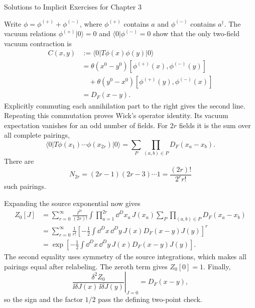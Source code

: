 \begin{bankssolutions}{Solutions to Implicit Exercises for Chapter 3}

Write $\phi=\phi^{(+)}+\phi^{(-)}$, where $\phi^{(+)}$ contains $a$ and
$\phi^{(-)}$ contains $a^\dagger$.  The vacuum relations
\(\phi^{(+)}|0\rangle=0\) and
\(\langle0|\phi^{(-)}=0\) show that the only two-field vacuum contraction is
\begin{align*}
 C(x,y)&:=\langle0|T\phi(x)\phi(y)|0\rangle\\
 &=\theta(x^0-y^0)
   [\phi^{(+)}(x),\phi^{(-)}(y)]\\
 &\quad+\theta(y^0-x^0)
   [\phi^{(+)}(y),\phi^{(-)}(x)]\\
 &=D_F(x-y).
\end{align*}
Explicitly commuting each annihilation part to the right gives the second
line.  Repeating this commutation proves Wick's operator identity.  Its vacuum expectation vanishes
for an odd number of fields.  For $2r$ fields it is the sum over all complete
pairings,
\[
 \langle0|T\phi(x_1)\cdots\phi(x_{2r})|0\rangle
 =\sum_{P}\prod_{(a,b)\in P}D_F(x_a-x_b).
\]
There are
\[
 N_{2r}=(2r-1)(2r-3)\cdots1
       =\frac{(2r)!}{2^r r!}
\]
such pairings.

Expanding the source exponential now gives
\begin{align*}
 Z_0[J]
 &=\sum_{r=0}^{\infty}\frac{\ii^{2r}}{(2r)!}
   \int\prod_{a=1}^{2r}\dd^D x_a\,J(x_a)
   \sum_P\prod_{(a,b)\in P}D_F(x_a-x_b)\\
 &=\sum_{r=0}^{\infty}\frac{1}{r!}
   \left[-\frac12\int\dd^D x\,\dd^D y\,
    J(x)D_F(x-y)J(y)\right]^r\\
 &=\exp\!\left[-\frac12\int\dd^D x\,\dd^D y\,
    J(x)D_F(x-y)J(y)\right].
\end{align*}
The second equality uses symmetry of the source integrations, which makes all
pairings equal after relabeling.  The zeroth term gives $Z_0[0]=1$.  Finally,
\[
 \left.\frac{\delta^2Z_0}
 {\ii\delta J(x)\,\ii\delta J(y)}\right|_{J=0}
 =D_F(x-y),
\]
so the sign and the factor $1/2$ pass the defining two-point check.


\end{bankssolutions}
